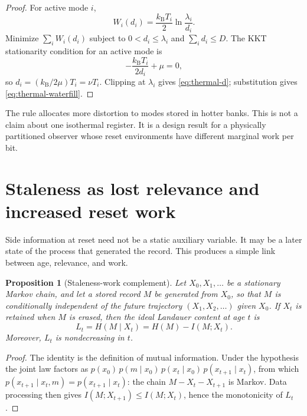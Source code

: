 \documentclass[letterpaper,onecolumn]{IEEEtran}
\newtheorem{proposition}{Proposition}
\theoremstyle{definition}
\theoremstyle{remark}
\newcommand{\1}{\mathbf{1}}
\newcommand{\kb}{k_{\mathrm B}}
\begin{document}
\begin{proof}
For active mode $i$,
\begin{equation}
 W_i(d_i)=\frac{\kb T_i}{2}\ln\frac{\lambda_i}{d_i}.
\end{equation}
Minimize $\sum_i W_i(d_i)$ subject to
$0<d_i\le\lambda_i$ and $\sum_i d_i\le D$. The KKT stationarity condition for
an active mode is
\begin{equation}
 -\frac{\kb T_i}{2d_i}+\mu=0,
\end{equation}
so $d_i=(\kb/2\mu)T_i=\nu T_i$. Clipping at $\lambda_i$ gives
\eqref{eq:thermal-d}; substitution gives \eqref{eq:thermal-waterfill}.
\end{proof}

The rule allocates more distortion to modes stored in hotter banks. This is not
a claim about one isothermal register. It is a design result for a physically
partitioned observer whose reset environments have different marginal work per
bit.

\section{Staleness as lost relevance and increased reset work}\label{sec:stale}

Side information at reset need not be a static auxiliary variable. It may be a
later state of the process that generated the record. This produces a simple
link between age, relevance, and work.

\begin{proposition}[Staleness-work complement]\label{prop:stale}
Let $X_0,X_1,\ldots$ be a stationary Markov chain, and let a stored record $M$
be generated from $X_0$, so that $M$ is conditionally independent of the future
trajectory $(X_1,X_2,\ldots)$ given $X_0$. If $X_t$ is retained when $M$ is
erased, then the ideal Landauer content at age $t$ is
\begin{equation}
 L_t=H(M\mid X_t)=H(M)-I(M;X_t).
 \label{eq:stale-complement}
\end{equation}
Moreover, $L_t$ is nondecreasing in $t$.
\end{proposition}

\begin{proof}
The identity is the definition of mutual information. Under the hypothesis the
joint law factors as $p(x_0)\,p(m\mid x_0)\,p(x_t\mid x_0)\,p(x_{t+1}\mid x_t)$,
from which $p(x_{t+1}\mid x_t,m)=p(x_{t+1}\mid x_t)$: the chain
$M-X_t-X_{t+1}$ is Markov. Data processing then gives
$I(M;X_{t+1})\le I(M;X_t)$, hence the monotonicity of $L_t$.
\end{proof}
\end{document}
